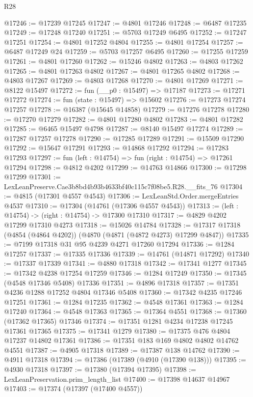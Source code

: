 \begin{lexlean}{R28}
\begin{coremodule}
@17246 := @17239 @17245
@17247 := @4801 @17246
@17248 := @6487 @17235
@17249 := @17248 @17240
@17251 := @5703 @17249 @6495
@17252 := @17247 @17251
@17254 := @4801 @17252 @4804
@17255 := @4801 @17254
@17257 := @6487 @17249 @24
@17259 := @5703 @17257 @6495
@17260 := @17255 @17259
@17261 := @4801 @17260
@17262 := @15246 @4802
@17263 := @4803 @17262
@17265 := @4801 @17263 @4802
@17267 := @4801 @17265 @4802
@17268 := @4803 @17267
@17269 := @4803 @17268
@17270 := @4801 @17269
@17271 := @8122 @15497
@17272 := fun (__p0 : @15497) => @17187
@17273 := @17271 @17272
@17274 := fun (state : @15497) => @15602
@17276 := @17273 @17274 @17257
@17278 := @16387 (@15645 @14858)
@17279 := @17276 @17278
@17280 := @17270 @17279
@17282 := @4801 @17280 @4802
@17283 := @4801 @17282
@17285 := @6465 @15497 @4798
@17287 := @8140 @15497 @17274
@17289 := @17287 @17257 @17278
@17290 := @17285 @17289
@17291 := @15509 @17290
@17292 := @15647 @17291
@17293 := @14868 @17292
@17294 := @17283 @17293
@17297 := fun (left : @14754) => fun (right : @14754) => @17261 @17294
@17298 := @4812 @4202
@17299 := @14763 @14866
@17300 := @17298 @17299
@17301 := LexLeanPreserve.Cae3b8bd4b93b4633bf40c115c7f08be5.R28.__fits_76
@17304 := @4815 (@17301 @4557 @4543)
@17306 := LexLeanStd.Order.mergeEntries @4537
@17310 := @17304 (@14761 (@17306 @4557 @4543))
@17313 := (left : @14754) -> (right : @14754) -> @17300 @17310
@17317 := @4829 @4202 @17299 @17310 @4273
@17318 := @15026 @14784
@17328 := @17317 @17318 (@4854 (@4864 @4202)) (@4870 (@4871 (@4872 @4273) @17299 @4847))
@17335 := @7199 @17318 @31 @95 @4239 @4271 @17260 @17294
@17336 := @1284 @17257
@17337 := @17335 @17336
@17339 := @14761 (@14871 @17292)
@17340 := @17337 @17339
@17341 := @4880 @17318
@17342 := @17341 @1277
@17345 := @17342 @4238 @17254 @17259
@17346 := @1284 @17249
@17350 := @17345 (@4548 @17346 @5408) @17336
@17351 := @4896 @17318
@17357 := @17351 @4236 @1288 @17252 @4804 @17346 @5408
@17360 := @17342 @4235 @17246 @17251
@17361 := @1284 @17235
@17362 := @4548 @17361
@17363 := @1284 @17240
@17364 := @4548 @17363
@17365 := @17364 @4551
@17368 := @17360 (@17362 @17365) @17346
@17374 := @17351 @1281 @4234 @17238 @17245 @17361 @17365
@17375 := @17341 @1279
@17380 := @17375 @476 @4804 @17237 @14802 @17361
@17386 := @17351 @183 @169 @4802 @4802 @14762 @4551
@17387 := @4905 @17318
@17389 := @17387 @138 @14762
@17390 := @4911 @17318
@17394 := @17386 (@17389 (@4910 (@17390 @138)))
@17395 := @4930 @17318
@17397 := @17380 (@17394 @17395)
@17398 := LexLeanPreservation.prim_length_list
@17400 := @17398 @14637 @14967
@17403 := @17374 (@17397 (@17400 @4557))

\end{coremodule}
\end{lexlean}
